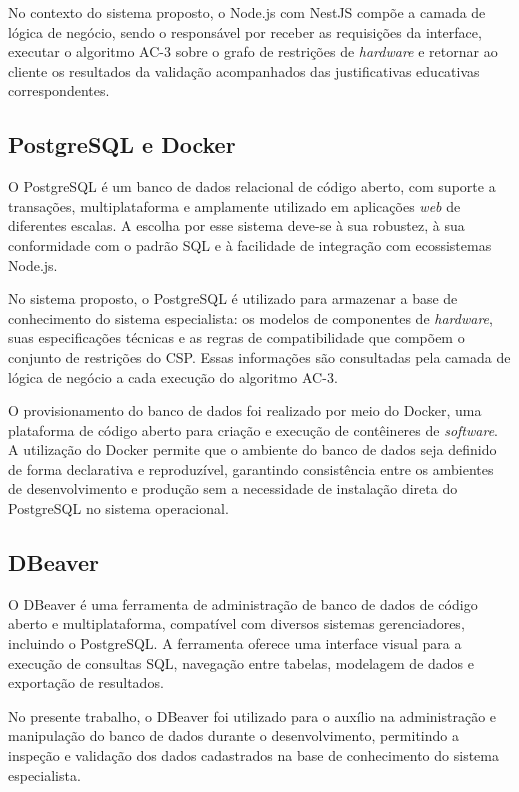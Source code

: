 No contexto do sistema proposto, o Node.js com NestJS compõe a camada de lógica de negócio, sendo o responsável por receber as requisições
da interface, executar o algoritmo AC-3 sobre o grafo de restrições de \textit{hardware} e retornar ao cliente os resultados da validação
acompanhados das justificativas educativas correspondentes.

\subsection{PostgreSQL e Docker}
O PostgreSQL é um banco de dados relacional de código aberto, com suporte a transações, multiplataforma e amplamente utilizado em aplicações
\textit{web} de diferentes escalas. A escolha por esse sistema deve-se à sua robustez, à sua conformidade com o padrão SQL e à facilidade
de integração com ecossistemas Node.js.

No sistema proposto, o PostgreSQL é utilizado para armazenar a base de conhecimento do sistema especialista: os modelos de componentes de
\textit{hardware}, suas especificações técnicas e as regras de compatibilidade que compõem o conjunto de restrições do CSP. Essas informações
são consultadas pela camada de lógica de negócio a cada execução do algoritmo AC-3.

O provisionamento do banco de dados foi realizado por meio do Docker, uma plataforma de código aberto para criação e execução de contêineres
de \textit{software}. A utilização do Docker permite que o ambiente do banco de dados seja definido de forma declarativa e reproduzível,
garantindo consistência entre os ambientes de desenvolvimento e produção sem a necessidade de instalação direta do PostgreSQL no sistema operacional.

\subsection{DBeaver}
O DBeaver é uma ferramenta de administração de banco de dados de código aberto e multiplataforma, compatível com diversos sistemas gerenciadores,
incluindo o PostgreSQL. A ferramenta oferece uma interface visual para a execução de consultas SQL, navegação entre tabelas, modelagem de dados e
exportação de resultados.

No presente trabalho, o DBeaver foi utilizado para o auxílio na administração e manipulação do banco de dados durante
o desenvolvimento, permitindo a inspeção e validação dos dados cadastrados na base de conhecimento do sistema especialista.


